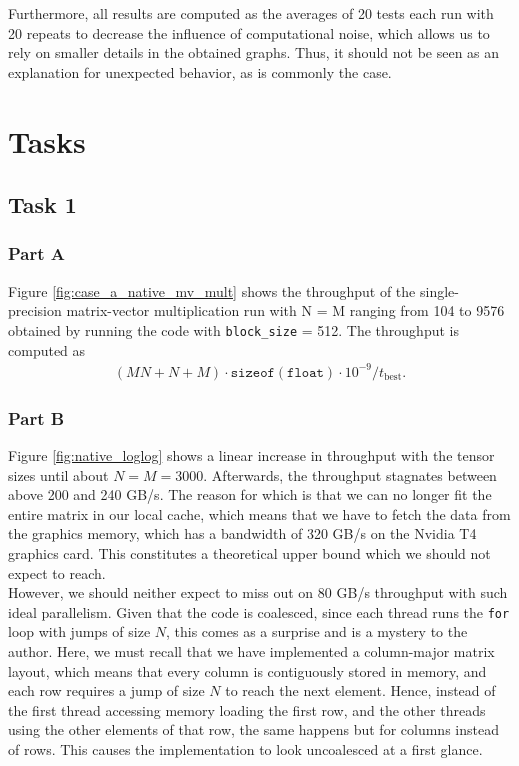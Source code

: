 \documentclass[9pt]{article}
\begin{document}
Furthermore, all results are computed as the averages of 20 tests each run with 20 repeats to decrease the influence of computational noise, which allows us to rely on smaller details in the obtained graphs. Thus, it should not be seen as an explanation for unexpected behavior, as is commonly the case. 
\section{Tasks}
\subsection{Task 1}
\subsubsection{Part A}
Figure \ref{fig:case_a_native_mv_mult} shows the throughput of the single-precision matrix-vector multiplication run with N = M ranging from 104 to 9576 obtained by running the code with \texttt{block\_size} = 512. The throughput is computed as
\begin{align*}
    (MN + N + M)\cdot\texttt{sizeof}(\texttt{float})\cdot 10^{-9}/t_{\text{best}}.
\end{align*}
\subsubsection{Part B}
Figure \ref{fig:native_loglog} shows a linear increase in throughput with the tensor sizes until about $N=M=3000$. Afterwards, the throughput stagnates between above 200 and 240 GB/s. The reason for which is that we can no longer fit the entire matrix in our local cache, which means that we have to fetch the data from the graphics memory, which has a bandwidth of 320 GB/s on the Nvidia T4 graphics card. This constitutes a theoretical upper bound which we should not expect to reach. \\

However, we should neither expect to miss out on 80 GB/s throughput with such ideal parallelism. Given that the code is coalesced, since each thread runs the \texttt{for} loop with jumps of size $N$, this comes as a surprise and is a mystery to the author. Here, we must recall that we have implemented a column-major matrix layout, which means that every column is contiguously stored in memory, and each row requires a jump of size $N$ to reach the next element. Hence, instead of the first thread accessing memory loading the first row, and the other threads using the other elements of that row, the same happens but for columns instead of rows. This causes the implementation to look uncoalesced at a first glance. \\
\end{document}
